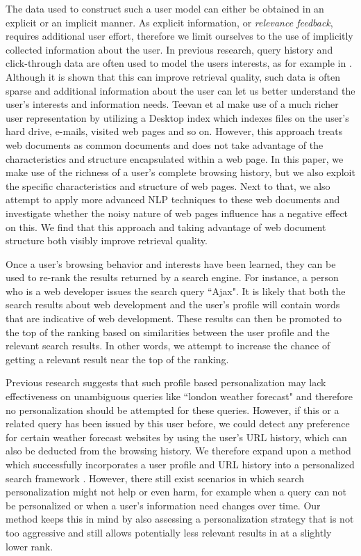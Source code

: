 \documentclass{sig-alternate}
\begin{document}
The data used to construct such a user model can either be obtained in an explicit or an implicit manner. As explicit information, or \emph{relevance feedback}, requires additional user effort, therefore we limit ourselves to the use of implicitly collected information about the user. In previous research, query history and click-through data are often used to model the users interests, as for example in \cite{Sriram:Shen}. Although it is shown that this can improve retrieval quality, such data is often sparse and additional information about the user can let us better understand the user's interests and information needs. Teevan et al \cite{Teevan:Main} make use of a much richer user representation by utilizing a Desktop index which indexes files on the user's hard drive, e-mails, visited web pages and so on. However, this approach treats web documents as common documents and does not take advantage of the characteristics and structure encapsulated within a web page. In this paper, we make use of the richness of a user's complete browsing history, but we also exploit the specific characteristics and structure of web pages. Next to that, we also attempt to apply more advanced NLP techniques to these web documents and investigate whether the noisy nature of web pages influence has a negative effect on this. We find that this approach and taking advantage of web document structure both visibly improve retrieval quality.

Once a user's browsing behavior and interests have been learned, they can be used to re-rank the results returned by a search engine. For instance, a person who is a web developer issues the search query ``Ajax". It is likely that both the search results about web development and the user's profile will contain words that are indicative of web development. These results can then be promoted to the top of the ranking based on similarities between the user profile and the relevant search results. In other words, we attempt to increase the chance of getting a relevant result near the top of the ranking.

Previous research \cite{Teevan:ToOrNot} suggests that such profile based personalization may lack effectiveness on unambiguous queries like ``london weather forecast" and therefore no personalization should be attempted for these queries. However, if this or a related query has been issued by this user before, we could detect any preference for certain weather forecast websites by using the user's URL history, which can also be deducted from the browsing history. We therefore expand upon a method which successfully incorporates a user profile and URL history into a personalized search framework \cite{Dou:Song}. However, there still exist scenarios in which search personalization might not help or even harm, for example when a query can not be personalized or when a user's information need changes over time. Our method keeps this in mind by also assessing a personalization strategy that is not too aggressive and still allows potentially less relevant results in at a slightly lower rank.
\end{document}
